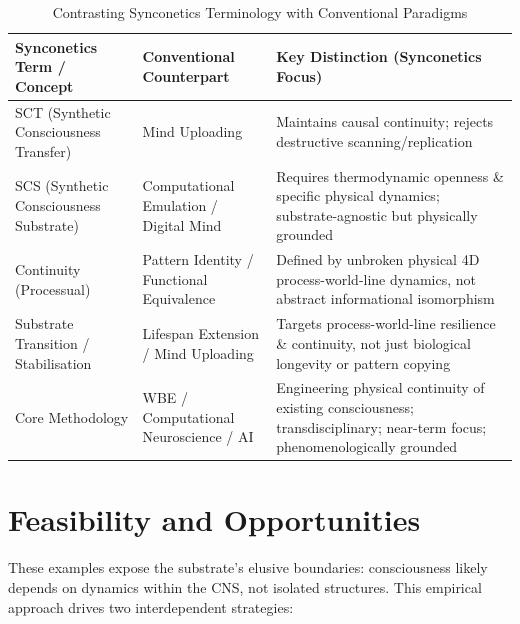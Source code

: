 \documentclass[10pt]{article}
\begin{document}
\begin{sloppypar}
  \begin{table}[ht!]
    \centering
    \caption{Contrasting Synconetics Terminology with Conventional Paradigms}
    \begin{tabular}{p{}p{}p{}}
      \toprule
      \textbf{Synconetics Term / Concept}     & \textbf{Conventional Counterpart}         & \textbf{Key Distinction (Synconetics Focus)}                                                                               \\
      \midrule
      SCT (Synthetic Consciousness Transfer)  & Mind Uploading                            & Maintains causal continuity; rejects destructive scanning/replication                                                      \\
      SCS (Synthetic Consciousness Substrate) & Computational Emulation / Digital Mind    & Requires thermodynamic openness \& specific physical dynamics; substrate-agnostic but physically grounded                  \\
      Continuity (Processual)                 & Pattern Identity / Functional Equivalence & Defined by unbroken physical 4D process-world-line dynamics, not abstract informational isomorphism                        \\
      Substrate Transition / Stabilisation    & Lifespan Extension / Mind Uploading       & Targets process-world-line resilience \& continuity, not just biological longevity or pattern copying                      \\
      Core Methodology                        & WBE / Computational Neuroscience / AI     & Engineering physical continuity of existing consciousness; transdisciplinary; near-term focus; phenomenologically grounded \\
      \bottomrule
    \end{tabular}
    \label{tab:terminology-intro}
  \end{table}

  \section{Feasibility and Opportunities}
  \label{sec:feasibility}


  These examples expose the substrate’s elusive boundaries: consciousness likely depends on dynamics within the CNS, not isolated structures. This empirical approach drives two interdependent strategies:


\end{sloppypar}
\end{document}
